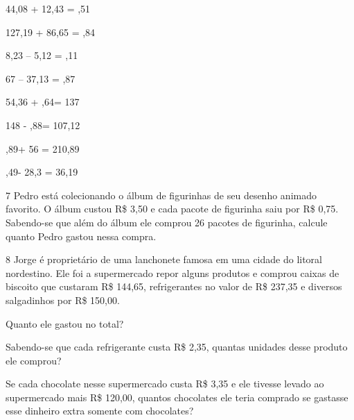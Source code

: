 \begin{escolha}
\item
  44,08 + 12,43 = ,51\preencher
\item
  127,19 + 86,65 = ,84\preencher
\item
  8,23 -- 5,12 = ,11\preencher
\item
  67 -- 37,13 = ,87\preencher
\item
  54,36 + ,64\preencher = 137
\item
  148 - ,88\preencher = 107,12
\item
  ,89\preencher + 56 = 210,89
\item
  ,49\preencher - 28,3 = 36,19
\end{escolha}


\num{7} Pedro está colecionando o álbum de figurinhas de seu desenho
animado favorito. O álbum custou R\$ 3,50 e cada pacote de figurinha
saiu por R\$ 0,75. Sabendo-se que além do álbum ele comprou 26 pacotes
de figurinha, calcule quanto Pedro gastou nessa compra.



\num{8} Jorge é proprietário de uma lanchonete famosa em uma cidade do
litoral nordestino. Ele foi a supermercado repor alguns produtos e
comprou caixas de biscoito que custaram R\$ 144,65, refrigerantes no
valor de R\$ 237,35 e diversos salgadinhos por R\$ 150,00.

\begin{escolha}
\item
  Quanto ele gastou no total?


\item
  Sabendo-se que cada refrigerante custa R\$ 2,35, quantas unidades
  desse produto ele comprou?


\item
  Se cada chocolate nesse supermercado custa R\$ 3,35 e ele tivesse
  levado ao supermercado mais R\$ 120,00, quantos chocolates ele teria
  comprado se gastasse esse dinheiro extra somente com chocolates?

\end{escolha}


